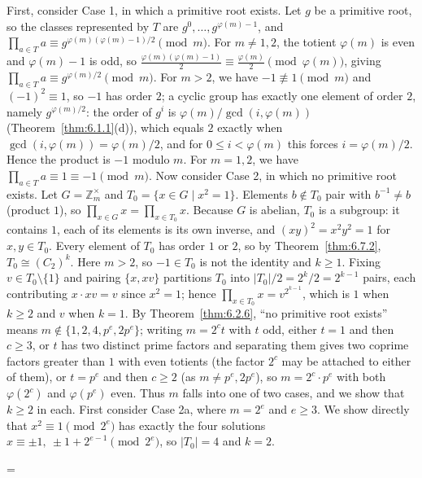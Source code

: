 \documentclass[11pt]{article}
\makeatletter
\theoremstyle{ntstyle}
\let\nt@closedisplay\]
\def\nt@guardedclose{\@ifnextchar\par{\nt@closeafterpar}{\@ifnextchar\end{\postdisplaypenalty\@M\nt@closedisplay}{\nt@closedisplay}}}
\def\nt@closeafterpar\par{\@ifnextchar\par{\nt@closeafterpar}{\@ifnextchar\end{\postdisplaypenalty\@M\nt@closedisplay\par}{\nt@closedisplay\par}}}
\renewenvironment{proof}[1][\proofname]{\par
  \pushQED{\qed}\normalfont\topsep\medskipamount\edef\nt@afterproof{\@endparpenalty=\the\@endparpenalty\relax}\@beginparpenalty\@M\@endparpenalty\@M\let\]\nt@guardedclose\trivlist\item[]\textit{#1\@addpunct{.}} \ignorespaces}{\ifvmode\addpenalty\@M\fi\popQED\nt@afterproof\endtrivlist\@endpefalse}
\newcommand{\ZmodUnits}[1]{\mathbb{Z}_{#1}^{\times}}
\makeatother
\begin{document}
\begin{proof} First, consider Case 1, in which a primitive root exists.
	Let $g$ be a primitive root, so the classes represented by $T$ are $g^{0}, \ldots,
		g^{\varphi(m)-1}$, and $\prod_{a \in T} a \equiv
		g^{\varphi(m)(\varphi(m)-1)/2} \pmod{m}$. For $m \neq 1, 2$,
	the totient $\varphi(m)$ is even and $\varphi(m)-1$ is odd, so
	$\frac{\varphi(m)(\varphi(m)-1)}{2} \equiv \frac{\varphi(m)}{2}
		\pmod{\varphi(m)}$, giving $\prod_{a \in T}a\equiv g^{\varphi(m)/2}\pmod{m}$. For $m>2$, we have $-1\not\equiv1\pmod{m}$ and $(-1)^2\equiv1$, so $-1$ has order $2$; a cyclic group has exactly one element of order $2$, namely $g^{\varphi(m)/2}$: the order of $g^{i}$ is $\varphi(m)/\gcd(i,\varphi(m))$ (Theorem~\ref{thm:6.1.1}(d)), which equals $2$ exactly when $\gcd(i,\varphi(m))=\varphi(m)/2$, and for $0\le i<\varphi(m)$ this forces $i=\varphi(m)/2$. Hence the product is $-1$ modulo $m$. For $m = 1, 2$,
	we have $\prod_{a \in T} a \equiv 1 \equiv -1 \pmod{m}$. Now consider Case 2, in which no
	primitive root exists. Let $G = \ZmodUnits{m}$ and $T_0 = \{x \in
		G \mid x^{2} = 1\}$. Elements $b \notin T_0$ pair with $b^{-1} \neq b$
	(product $1$), so $\prod_{x \in G} x = \prod_{x \in T_0} x$. Because $G$
	is abelian, $T_0$ is a subgroup: it contains $1$, each of its elements is
	its own inverse, and $(xy)^2=x^2y^2=1$ for $x,y\in T_0$. Every element
	of $T_0$ has order $1$ or $2$, so by
	Theorem~\ref{thm:6.7.2}, $T_0 \cong (C_2)^{k}$. Here $m>2$, so $-1\in T_0$ is not the identity and $k\ge1$. Fixing $v \in T_0 \setminus
		\{1\}$ and pairing $\{x, xv\}$ partitions $T_0$ into
		$|T_0|/2 = 2^{k}/2 = 2^{k-1}$ pairs, each contributing
	$x\cdot xv = v$ since $x^{2} = 1$; hence $\prod_{x \in T_0} x =
		v^{2^{k-1}}$, which is $1$ when $k \ge 2$ and $v$ when $k = 1$. By
	Theorem~\ref{thm:6.2.6}, ``no primitive root exists'' means $m \notin \{1, 2,
		4, p^{e}, 2p^{e}\}$; writing $m = 2^{c} t$ with $t$ odd, either $t = 1$
	and then $c \ge 3$, or $t$ has two distinct prime factors and
	separating them gives two coprime factors greater than $1$ with even totients
	(the factor $2^{c}$ may be attached to either of them), or $t = p^{e}$ and then $c \ge 2$
	(as $m \neq p^{e}, 2p^{e}$), so $m = 2^{c} \cdot p^{e}$ with both
	$\varphi(2^{c})$ and $\varphi(p^{e})$ even. Thus $m$ falls into one of
	two cases, and we show that $k \ge 2$ in each. First consider Case 2a, where $m = 2^{e}$ and $e \ge 3$. We show directly that $x^{2}
		\equiv 1 \pmod{2^{e}}$ has exactly the four solutions $x \equiv \pm
			1,\ \pm 1 + 2^{e-1} \pmod{2^{e}}$, so $|T_0| = 4$ and $k = 2$.

\end{proof}
\end{document}
